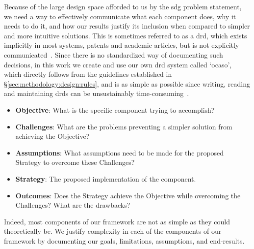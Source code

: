 Because of the large design space afforded to us by the \ac{sdg} problem statement, we need a way to effectively communicate what each component does, why it needs to do it, and how our results justify its inclusion when compared to simpler and more intuitive solutions. This is sometimes referred to as a \ac{drd}, which exists implicitly in most systems, patents and academic articles, but is not explicitly communicated~\cite{yue2023_design_rationale}. Since there is no standardized way of documenting such decisions, in this work we create and use our own \ac{drd} system called `\ac{ocaso}', which directly follows from the guidelines established in \S\ref{sec:methodology:design:rules}, and is as simple as possible since writing, reading and maintaining \acp{drd} can be unsustainably time-consuming~\cite{falessi2013_design_rationale}.

\begin{itemize}
	\item \textbf{Objective}: What is the specific component trying to accomplish?
	\item \textbf{Challenges}: What are the problems preventing a simpler solution from achieving the Objective?
	\item \textbf{Assumptions}: What assumptions need to be made for the proposed Strategy to overcome these Challenges?
	\item \textbf{Strategy}: The proposed implementation of the component.
	\item \textbf{Outcomes}: Does the Strategy achieve the Objective while overcoming the Challenges? What are the drawbacks?
\end{itemize}

Indeed, most components of our framework are not as simple as they could theoretically be. We justify complexity in each of the components of our framework by documenting our goals, limitations, assumptions, and end-results.

